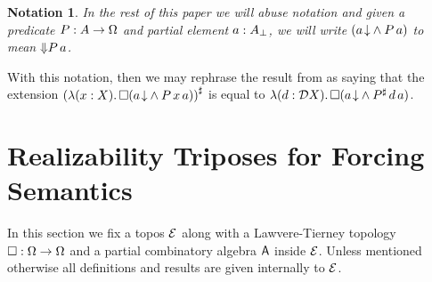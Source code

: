 \documentclass[11pt]{article}
\newtheorem{nota}[thrm]{Notation}
\begin{document}
\begin{nota}
  In the rest of this paper we will abuse notation and given
  a predicate \(P : A \to \Omega\) and partial element \(a : {A}_\bot\),
  we will write
  \(({{{a}\!\downarrow}}\land{P\,a})\) to mean \({\Downarrow}{P}\,a\).
\end{nota}

With this notation, then we may rephrase the result from
 as saying that the extension
%
\(
  {({\mathop{\lambda({x:X}).}{\Box{({{{a}\!\downarrow}}\land{P\,x\,a})}}})}^\sharp
\)
%
is equal to
%
\(
  {\mathop{\lambda({d:\mathcal{D}{X}}).}{\Box{({{{a}\!\downarrow}}\land{{P}^\sharp\,d\,a})}}}
\).


\newpage

\section{Realizability Triposes for Forcing Semantics}

In this section we fix a topos \(\mathcal{E}\) along with a Lawvere-Tierney
topology \(\Box : \Omega \to \Omega\) and a partial combinatory
algebra \(\mathsf{A}\) inside \(\mathcal{E}\).
%
Unless mentioned otherwise all definitions and results are given
internally to \(\mathcal{E}\).
\end{document}
